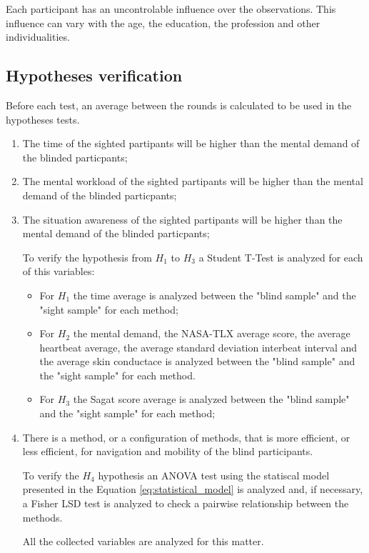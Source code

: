 Each participant has an uncontrolable influence over the observations. This influence can vary with the age, the education, the profession and other individualities.

\subsection{Hypotheses verification}

Before each test, an average between the rounds is calculated to be used in the hypotheses tests.

\begin{enumerate}[label = $H_\arabic*$:]
    \setlength\itemindent{2ex}
    \item The time of the sighted partipants will be higher than the mental demand of the blinded particpants;
    \item The mental workload of the sighted partipants will be higher than the mental demand of the blinded particpants;
    \item The situation awareness of the sighted partipants will be higher than the mental demand of the blinded particpants;
    
    To verify the hypothesis from $H_1$ to $H_3$ a Student T-Test is analyzed for each of this variables:
    \begin{itemize}
        \item For $H_1$ the time average is analyzed between the "blind sample" and the "sight sample" for each method;
        \item For $H_2$ the mental demand, the NASA-TLX average score, the average heartbeat average, the average standard deviation interbeat interval and the average skin conductace is analyzed between the "blind sample" and the "sight sample" for each method.
        \item For $H_3$ the Sagat score average is analyzed between the "blind sample" and the "sight sample" for each method;
    \end{itemize}

    \item There is a method, or a configuration of methods, that is more efficient, or less efficient, for navigation and mobility of the blind participants.
    
    To verify the $H_4$ hypothesis an ANOVA test using the statiscal model presented in the Equation \ref{eq:statistical_model} is analyzed and, if necessary, a Fisher LSD test is analyzed to check a pairwise relationship between the methods.

    All the collected variables are analyzed for this matter.
\end{enumerate}